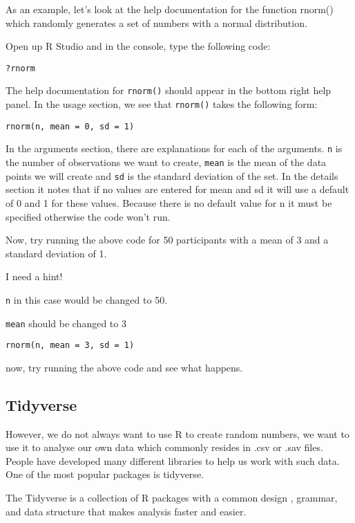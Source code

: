 \documentclass[]{book}
\begin{document}
As an example, let's look at the help documentation for the function
rnorm() which randomly generates a set of numbers with a normal
distribution.

Open up R Studio and in the console, type the following code:

\begin{verbatim}
?rnorm
\end{verbatim}

The help documentation for \texttt{rnorm()} should appear in the bottom
right help panel. In the usage section, we see that \texttt{rnorm()}
takes the following form:

\begin{verbatim}
rnorm(n, mean = 0, sd = 1)
\end{verbatim}

In the arguments section, there are explanations for each of the
arguments. \texttt{n} is the number of observations we want to create,
\texttt{mean} is the mean of the data points we will create and
\texttt{sd} is the standard deviation of the set. In the details section
it notes that if no values are entered for mean and sd it will use a
default of 0 and 1 for these values. Because there is no default value
for n it must be specified otherwise the code won't run.

Now, try running the above code for 50 participants with a mean of 3 and
a standard deviation of 1.

I need a hint!

\texttt{n} in this case would be changed to 50.

\texttt{mean} should be changed to 3

\texttt{rnorm(n,\ mean\ =\ 3,\ sd\ =\ 1)}

now, try running the above code and see what happens.

\subsection{Tidyverse}\label{tidyverse}

However, we do not always want to use R to create random numbers, we
want to use it to analyse our own data which commonly resides in .csv or
.sav files. People have developed many different libraries to help us
work with such data. One of the most popular packages is tidyverse.

The Tidyverse is a collection of R packages with a common design ,
grammar, and data structure that makes analysis faster and easier.
\end{document}
